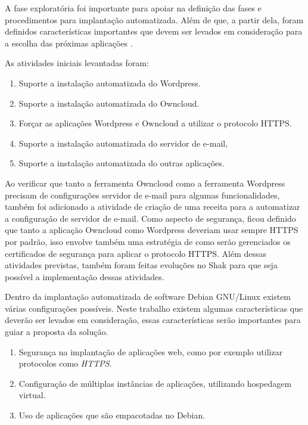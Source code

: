 A fase exploratória foi importante para apoiar na definição das fases e procedimentos para implantação
automatizada. Além de que, a partir dela, foram definidos características importantes 
que devem ser levados em consideração para a escolha das próximas aplicações .

As atividades iniciais levantadas foram:

 \begin{enumerate}
   \item  Suporte a instalação automatizada do Wordpress.
   \item  Suporte a instalação automatizada do Owncloud.
   \item  Forçar as aplicações Wordpress e Owncloud a
   utilizar o protocolo HTTPS.
   \item  Suporte a instalação automatizada do servidor de e-mail,
   \item  Suporte a instalação automatizada do outras aplicações.
 \end{enumerate}

Ao verificar que tanto a ferramenta Owncloud como a ferramenta Wordpress precisam
de configurações servidor de e-mail para algumas funcionalidades, também foi adicionado
a atividade de criação de uma receita para a automatizar a configuração de
servidor de e-mail. Como aspecto de segurança, ficou definido que tanto a aplicação
Owncloud como Wordpress deveriam usar sempre HTTPS por padrão, isso envolve também
uma estratégia de como serão gerenciados os certificados de segurança para aplicar
o protocolo HTTPS. Além dessas atividades previstas, também foram feitas evoluções
no Shak para que seja possível a implementação dessas atividades.

Dentro da implantação automatizada de software Debian GNU/Linux existem várias
configurações possíveis. Neste trabalho existem algumas características que 
deverão ser levados em consideração, essas características serão importantes para 
guiar a proposta da solução.

\begin{enumerate}
  \item  Segurança na implantação de aplicações web,
   como por exemplo utilizar protocolos como \textit{HTTPS}.
  \item  Configuração de múltiplas instâncias de
   aplicações, utilizando hospedagem virtual.
  \item  Uso de aplicações que são empacotadas no Debian.
\end{enumerate}

